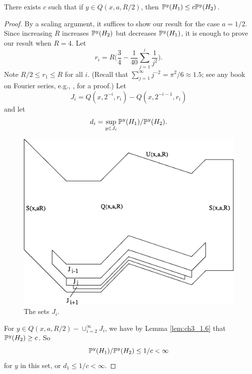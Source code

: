 \begin{theorem}\label{thm:ch3_1.7}
There exists $c$ such that if $y \in Q(x,a,R/2)$, then $\P^y(H_1) \leq c\P^y(H_2)$.
\end{theorem}

\begin{proof}
By a scaling argument, it suffices to show our result for the case $a = 1/2$. Since increasing $R$ increases $\P^y(H_2)$ but decreases $\P^y(H_1)$, it is enough to prove our result when $R = 4$. Let
\begin{equation}\label{eq:ch3_1.13}
    r_i = R\bigg(\frac{3}{4} - \frac{1}{40}\sum_{j=1}^i \frac{1}{j^2}\bigg).
\end{equation}
Note $R/2 \leq r_1 \leq R$ for all $i$. (Recall that $\sum_{j=1}^\infty j^{-2} = \pi^2/6 \approx 1.5$; see any book on Fourier series, e.g., \cite{Folland1992}, for a proof.) Let
\[
    J_i = Q(x,2^{-i},r_i) - Q(x,2^{-i-1},r_i)
\]
and let
\[
    d_i = \sup_{y\in J_i} \P^y(H_1)/\P^y(H_2).
\]

\bigskip
\begin{figure}[ht]
    \centering\includegraphics{Images/Img6.png}
    \bigskip
    \caption{The sets $J_i$.}
    \label{fig:ch3_1.2}
\end{figure}

For $y \in Q(x,a,R/2)-\cup_{i=2}^\infty J_i$, we have by Lemma \ref{lem:ch3_1.6} that $\P^y(H_2) \geq c$. So
\[
    \P^y(H_1)/\P^y(H_2) \leq 1/c < \infty
\]
for $y$ in this set, or $d_1 \leq 1/c < \infty$.

\mpagebreak


\end{proof}
